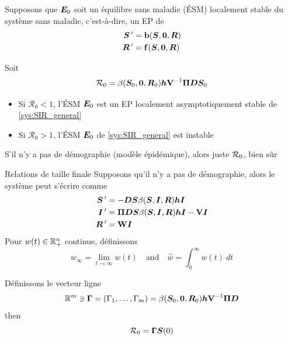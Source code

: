 \documentclass[aspectratio=169]{beamer}\usepackage[]{graphicx}\usepackage[]{xcolor}
\begin{document}
\begin{frame}
Supposons que $\bm{E}_0$ soit un équilibre sans maladie (ÉSM) localement stable du système sans maladie, c'est-à-dire, un EP de
\begin{align*}
\bS\pprime &= \mathbf{b}(\bS,\b0,\bR) \\
\bR\pprime &= \mathbf{f}(\bS,\b0,\bR) \\
\end{align*}

\begin{theorem}
Soit
\begin{equation}\label{eq:R0_final_size_method}
\mathcal{R}_0 = 
\beta(\bS_0,\b0,\bR_0)
\bh\mathbf{V}^{-1}
\bPi\bD\bS_0
\end{equation}
\begin{itemize}
\item Si $\mathcal{R}_0<1$, l'ÉSM $\bm{E}_0$ est un EP localement asymptotiquement stable de \eqref{sys:SIR_general}
\item Si $\mathcal{R}_0>1$, l'ÉSM $\bm{E}_0$ de \eqref{sys:SIR_general} est instable
\end{itemize}
\end{theorem}
\vfill
S'il n'y a pas de démographie (modèle épidémique), alors juste $\mathcal{R}_0$, bien sûr
\end{frame}  

\begin{frame}{Relations de taille finale}
Supposons qu'il n'y a pas de démographie, alors le système peut s'écrire comme
\begin{subequations}
\begin{align}
\bm{S}\,' &= -\bm{D}\bm{S}\beta(\bm{S},\bm{I},\bm{R})\bm{h}\bm{I}  \label{sys:SIR_epi_dS} \\
\bm{I}\,' &= \bm{\Pi}\bm{D}\bm{S}\beta(\bm{S},\bm{I},\bm{R})\bm{h}\bm{I}-\mathbf{V}\bm{I} 
\label{sys:SIR_epi_dI} \\
\bm{R}\,' &= \mathbf{W}\bm{I}
\label{sys:SIR_epi_dR} 
\end{align}
\end{subequations}
\vfill
Pour $w(t)\in\mathbb{R}_+^n$ continue, définissons
$$
w_\infty = \lim_{t\to\infty}w(t)\quad\text{and}\quad
\hat{w}=\int_0^\infty w(t)\ dt
$$
\end{frame}  

\begin{frame}
Définissons le vecteur ligne 
\[
\IR^m\ni\bGamma
=(\Gamma_1,\ldots,\Gamma_m)=\beta(\bS_0,\b0,\bR_0)\bh\mathbf{V}^{-1}\bPi\bD
\]
then 
\[
\mathcal{R}_0=\bm{\Gamma}\bm{S}(0)
\]
\end{frame}  
\end{document}
